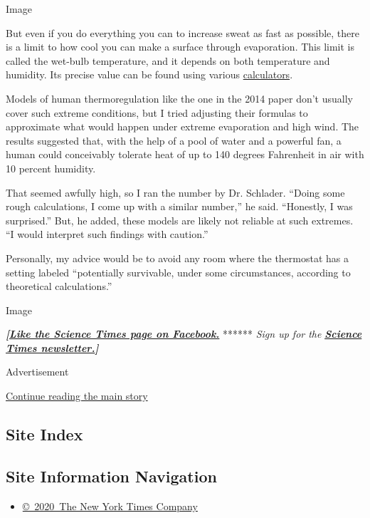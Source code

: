 Image

But even if you do everything you can to increase sweat as fast as
possible, there is a limit to how cool you can make a surface through
evaporation. This limit is called the wet-bulb temperature, and it
depends on both temperature and humidity. Its precise value can be found
using various \href{https://www.weather.gov/epz/wxcalc_rh}{calculators}.

Models of human thermoregulation like the one in the 2014 paper don't
usually cover such extreme conditions, but I tried adjusting their
formulas to approximate what would happen under extreme evaporation and
high wind. The results suggested that, with the help of a pool of water
and a powerful fan, a human could conceivably tolerate heat of up to 140
degrees Fahrenheit in air with 10 percent humidity.

That seemed awfully high, so I ran the number by Dr. Schlader. ``Doing
some rough calculations, I come up with a similar number,'' he said.
``Honestly, I was surprised.'' But, he added, these models are likely
not reliable at such extremes. ``I would interpret such findings with
caution.''

Personally, my advice would be to avoid any room where the thermostat
has a setting labeled ``potentially survivable, under some
circumstances, according to theoretical calculations.''

Image

\textbf{\emph{{[}}\href{http://on.fb.me/1paTQ1h}{\emph{Like the Science
Times page on Facebook.}}} ****** \emph{\textbar{} Sign up for the}
\textbf{\href{http://nyti.ms/1MbHaRU}{\emph{Science Times
newsletter.}}\emph{{]}}}

Advertisement

\protect\hyperlink{after-bottom}{Continue reading the main story}

\hypertarget{site-index}{%
\subsection{Site Index}\label{site-index}}

\hypertarget{site-information-navigation}{%
\subsection{Site Information
Navigation}\label{site-information-navigation}}

\begin{itemize}
\tightlist
\item
  \href{https://help.nytimes3xbfgragh.onion/hc/en-us/articles/115014792127-Copyright-notice}{©~2020~The
  New York Times Company}
\end{itemize}

